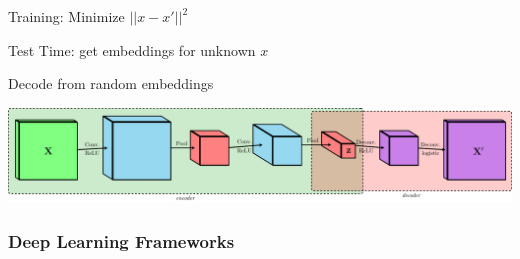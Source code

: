 \documentclass{beamer}
\def\layersep{2.5cm}
\begin{document}
\begin{frame}

\begin{overlayarea}{\linewidth}{.3\textheight}
{
\begin{center}
Training: Minimize $||x-x'||^2$
\end{center}
}
{
\begin{center}
Test Time: get embeddings for unknown $x$
\end{center}
}
{
\begin{center}
Decode from random embeddings
\end{center}
}
\end{overlayarea}
\end{frame} 

\begin{frame}
  \includegraphics[width=\textwidth]{cac.pdf}
\end{frame}



\begin{frame}[plain]
\frametitle{Deep Learning Frameworks}
\begin{center}
\end{center}
\end{frame}
\end{document}
